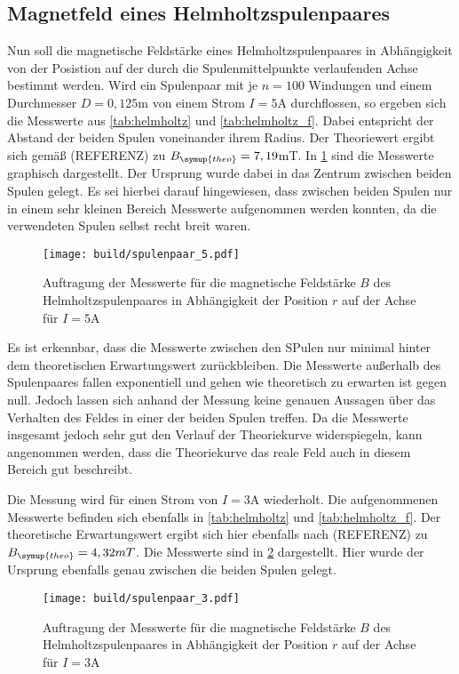 \newpage
\subsection{Magnetfeld eines Helmholtzspulenpaares}

Nun soll die magnetische Feldstärke eines Helmholtzspulenpaares in Abhängigkeit von
der Posistion auf der durch die Spulenmittelpunkte verlaufenden Achse bestimmt werden.
Wird ein Spulenpaar mit je $n=100$ Windungen und einem Durchmesser $D=0,125$m
von einem Strom $I=5$A durchflossen, so ergeben sich die Messwerte aus \ref{tab:helmholtz}
und \ref{tab:helmholtz_f}.
Dabei entspricht der Abstand der beiden Spulen voneinander ihrem Radius.
Der Theoriewert ergibt sich gemäß (REFERENZ) zu $B_{\symup{theo}}=7,19$mT. In
\ref{fig:spulenpaar_5} sind die Messwerte graphisch dargestellt. Der Ursprung wurde
dabei in das Zentrum zwischen beiden Spulen gelegt. Es sei hierbei darauf
hingewiesen, dass zwischen beiden Spulen nur in einem sehr kleinen Bereich Messwerte
aufgenommen werden konnten, da die verwendeten Spulen selbst recht breit waren.

\begin{figure}
  \centering
  \texttt{[image: build/spulenpaar\_5.pdf]}
  \caption{Auftragung der Messwerte für die magnetische Feldstärke $B$ des Helmholtzspulenpaares
  in Abhängigkeit der Position $r$ auf der Achse für $I=5$A}
  \label{fig:spulenpaar_5}
\end{figure}

Es ist erkennbar, dass die Messwerte zwischen den SPulen nur minimal hinter dem theoretischen Erwartungswert
zurückbleiben. Die Messwerte außerhalb des Spulenpaares fallen exponentiell und gehen
wie theoretisch zu erwarten ist gegen null. Jedoch lassen sich anhand der Messung keine
genauen Aussagen über das Verhalten des Feldes in einer der beiden Spulen treffen.
Da die Messwerte insgesamt jedoch sehr gut den Verlauf der Theoriekurve widerspiegeln,
kann angenommen werden, dass die Theoriekurve das reale Feld auch in diesem Bereich gut beschreibt.


Die Messung wird für einen Strom von $I=3$A wiederholt. Die aufgenommenen Messwerte
befinden sich ebenfalls in \ref{tab:helmholtz} und \ref{tab:helmholtz_f}. Der theoretische Erwartungswert
ergibt sich hier ebenfalls nach (REFERENZ) zu $B_{\symup{theo}}=4,32mT$. Die Messwerte
sind in \ref{fig:spulenpaar_3} dargestellt. Hier wurde der Ursprung ebenfalls genau
zwischen die beiden Spulen gelegt.

\begin{figure}
  \centering
  \texttt{[image: build/spulenpaar\_3.pdf]}
  \caption{Auftragung der Messwerte für die magnetische Feldstärke $B$ des Helmholtzspulenpaares
  in Abhängigkeit der Position $r$ auf der Achse für $I=3$A}
  \label{fig:spulenpaar_3}
\end{figure}

